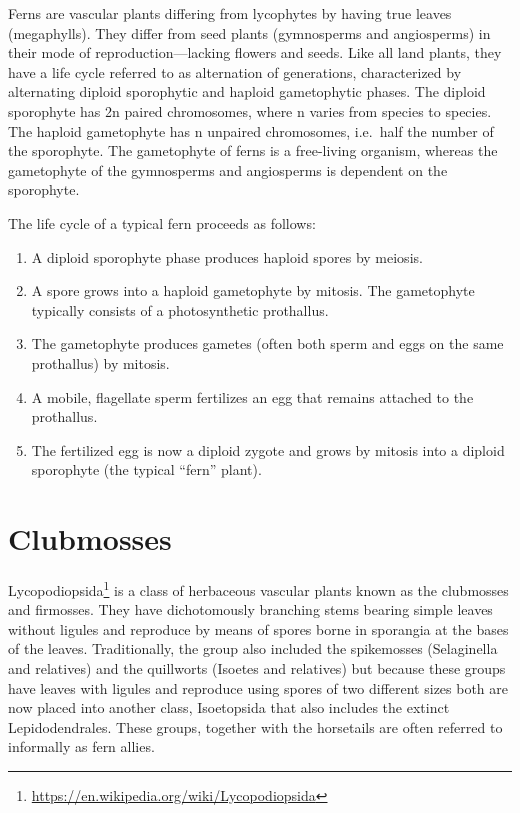 \documentclass[]{book}
\providecommand{\tightlist}{%
  \setlength{\itemsep}{0pt}\setlength{\parskip}{0pt}}
\let\rmarkdownfootnote\footnote%
\def\footnote{\protect\rmarkdownfootnote}
\renewcommand{\href}[2]{#2\footnote{\url{#1}}}
\theoremstyle{definition}
\theoremstyle{definition}
\theoremstyle{definition}
\theoremstyle{remark}
\begin{document}
Ferns are vascular plants differing from lycophytes by having true
leaves (megaphylls). They differ from seed plants (gymnosperms and
angiosperms) in their mode of reproduction---lacking flowers and seeds.
Like all land plants, they have a life cycle referred to as alternation
of generations, characterized by alternating diploid sporophytic and
haploid gametophytic phases. The diploid sporophyte has 2n paired
chromosomes, where n varies from species to species. The haploid
gametophyte has n unpaired chromosomes, i.e.~half the number of the
sporophyte. The gametophyte of ferns is a free-living organism, whereas
the gametophyte of the gymnosperms and angiosperms is dependent on the
sporophyte.

The life cycle of a typical fern proceeds as follows:

\begin{enumerate}
\def\labelenumi{\arabic{enumi}.}
\tightlist
\item
  A diploid sporophyte phase produces haploid spores by meiosis.
\item
  A spore grows into a haploid gametophyte by mitosis. The gametophyte
  typically consists of a photosynthetic prothallus.
\item
  The gametophyte produces gametes (often both sperm and eggs on the
  same prothallus) by mitosis.
\item
  A mobile, flagellate sperm fertilizes an egg that remains attached to
  the prothallus.
\item
  The fertilized egg is now a diploid zygote and grows by mitosis into a
  diploid sporophyte (the typical ``fern'' plant).
\end{enumerate}

\section{Clubmosses}\label{clubmosses}

\href{https://en.wikipedia.org/wiki/Lycopodiopsida}{Lycopodiopsida} is a
class of herbaceous vascular plants known as the clubmosses and
firmosses. They have dichotomously branching stems bearing simple leaves
without ligules and reproduce by means of spores borne in sporangia at
the bases of the leaves. Traditionally, the group also included the
spikemosses (Selaginella and relatives) and the quillworts (Isoetes and
relatives) but because these groups have leaves with ligules and
reproduce using spores of two different sizes both are now placed into
another class, Isoetopsida that also includes the extinct
Lepidodendrales. These groups, together with the horsetails are often
referred to informally as fern allies.
\end{document}
